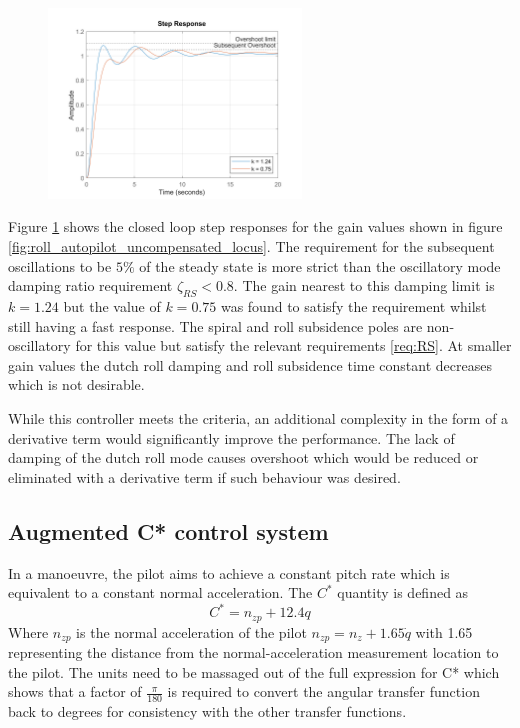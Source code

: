 \documentclass{article}
\begin{document}
\begin{figure}[H]
    \centering
    \includegraphics[width=0.6\textwidth]{figures/roll_autopilot_step_uncompensated.png}
    \caption{}
    \label{fig:roll_autopilot_step_uncompensated}
\end{figure}

Figure \ref{fig:roll_autopilot_step_uncompensated} shows the closed loop step responses for the gain values shown in figure \ref{fig:roll_autopilot_uncompensated_locus}.
The requirement for the subsequent oscillations to be $5 \%$ of the steady state is more strict than the oscillatory mode damping ratio requirement $\zeta_{RS}<0.8$.
The gain nearest to this damping limit is $k=1.24$ but the value of $k=0.75$ was found to satisfy the requirement whilst still having a fast response.
The spiral and roll subsidence poles are non-oscillatory for this value but satisfy the relevant requirements \ref{req:RS}.
At smaller gain values the dutch roll damping and roll subsidence time constant decreases which is not desirable.

While this controller meets the criteria, an additional complexity in the form of a derivative term would significantly improve the performance.
The lack of damping of the dutch roll mode causes overshoot which would be reduced or eliminated with a derivative term if such behaviour was desired.


\subsection{Augmented C* control system}

In a manoeuvre, the pilot aims to achieve a constant pitch rate which is equivalent to a constant normal acceleration.
The $C^*$ quantity is defined as
\begin{equation}
    C^* = n_{zp} + 12.4q
\end{equation}
Where $n_{zp}$ is the normal acceleration of the pilot $n_{zp} = n_z + 1.65 \dot{q}$ with 1.65 representing the distance from the normal-acceleration measurement location to the pilot.
The units need to be massaged out of the full expression for C* which shows that a factor of $\frac{\pi}{180}$ is required to convert the angular transfer function back to degrees for consistency with the other transfer functions.
\end{document}
